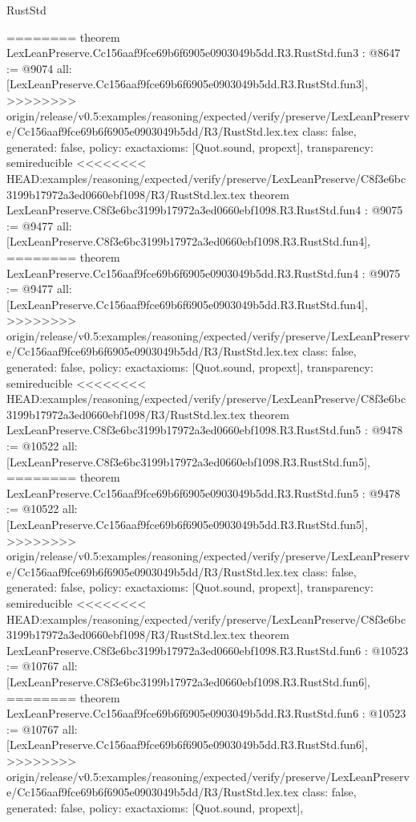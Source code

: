 \begin{lexlean}{RustStd}
\begin{coremodule}
{\begin{coremodule}
{{{{{{========
theorem LexLeanPreserve.Cc156aaf9fce69b6f6905e0903049b5dd.R3.RustStd.fun3 : @8647 := @9074 {
  all: [LexLeanPreserve.Cc156aaf9fce69b6f6905e0903049b5dd.R3.RustStd.fun3],
>>>>>>>> origin/release/v0.5:examples/reasoning/expected/verify/preserve/LexLeanPreserve/Cc156aaf9fce69b6f6905e0903049b5dd/R3/RustStd.lex.tex
  class: false,
  generated: false,
  policy: exact{axioms: [Quot.sound, propext]},
  transparency: semireducible
}
<<<<<<<< HEAD:examples/reasoning/expected/verify/preserve/LexLeanPreserve/C8f3e6bc3199b17972a3ed0660ebf1098/R3/RustStd.lex.tex
theorem LexLeanPreserve.C8f3e6bc3199b17972a3ed0660ebf1098.R3.RustStd.fun4 : @9075 := @9477 {
  all: [LexLeanPreserve.C8f3e6bc3199b17972a3ed0660ebf1098.R3.RustStd.fun4],
========
theorem LexLeanPreserve.Cc156aaf9fce69b6f6905e0903049b5dd.R3.RustStd.fun4 : @9075 := @9477 {
  all: [LexLeanPreserve.Cc156aaf9fce69b6f6905e0903049b5dd.R3.RustStd.fun4],
>>>>>>>> origin/release/v0.5:examples/reasoning/expected/verify/preserve/LexLeanPreserve/Cc156aaf9fce69b6f6905e0903049b5dd/R3/RustStd.lex.tex
  class: false,
  generated: false,
  policy: exact{axioms: [Quot.sound, propext]},
  transparency: semireducible
}
<<<<<<<< HEAD:examples/reasoning/expected/verify/preserve/LexLeanPreserve/C8f3e6bc3199b17972a3ed0660ebf1098/R3/RustStd.lex.tex
theorem LexLeanPreserve.C8f3e6bc3199b17972a3ed0660ebf1098.R3.RustStd.fun5 : @9478 := @10522 {
  all: [LexLeanPreserve.C8f3e6bc3199b17972a3ed0660ebf1098.R3.RustStd.fun5],
========
theorem LexLeanPreserve.Cc156aaf9fce69b6f6905e0903049b5dd.R3.RustStd.fun5 : @9478 := @10522 {
  all: [LexLeanPreserve.Cc156aaf9fce69b6f6905e0903049b5dd.R3.RustStd.fun5],
>>>>>>>> origin/release/v0.5:examples/reasoning/expected/verify/preserve/LexLeanPreserve/Cc156aaf9fce69b6f6905e0903049b5dd/R3/RustStd.lex.tex
  class: false,
  generated: false,
  policy: exact{axioms: [Quot.sound, propext]},
  transparency: semireducible
}
<<<<<<<< HEAD:examples/reasoning/expected/verify/preserve/LexLeanPreserve/C8f3e6bc3199b17972a3ed0660ebf1098/R3/RustStd.lex.tex
theorem LexLeanPreserve.C8f3e6bc3199b17972a3ed0660ebf1098.R3.RustStd.fun6 : @10523 := @10767 {
  all: [LexLeanPreserve.C8f3e6bc3199b17972a3ed0660ebf1098.R3.RustStd.fun6],
========
theorem LexLeanPreserve.Cc156aaf9fce69b6f6905e0903049b5dd.R3.RustStd.fun6 : @10523 := @10767 {
  all: [LexLeanPreserve.Cc156aaf9fce69b6f6905e0903049b5dd.R3.RustStd.fun6],
>>>>>>>> origin/release/v0.5:examples/reasoning/expected/verify/preserve/LexLeanPreserve/Cc156aaf9fce69b6f6905e0903049b5dd/R3/RustStd.lex.tex
  class: false,
  generated: false,
  policy: exact{axioms: [Quot.sound, propext]},
}}}}}}}}}}
\end{coremodule}}
\end{coremodule}
\end{lexlean}
